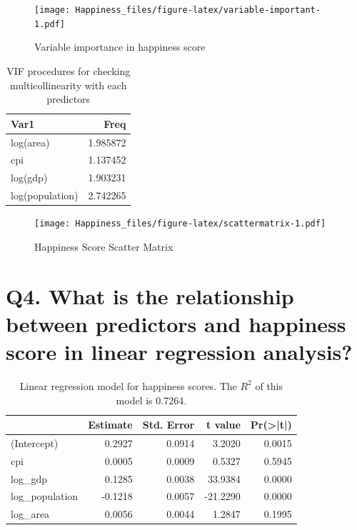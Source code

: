 \documentclass[11pt,a4paper,]{article}
\begin{document}
\begin{figure}
\centering
\texttt{[image: Happiness\_files/figure-latex/variable-important-1.pdf]}
\caption{\label{fig:variable-important}Variable importance in happiness score}
\end{figure}

\begin{table}

\caption{\label{tab:mulitilinearity}VIF procedures for checking multicollinearity with each predictors}
\begin{tabular}[t]{l|r}
\hline
Var1 & Freq\\
\hline
log(area) & 1.985872\\
\hline
cpi & 1.137452\\
\hline
log(gdp) & 1.903231\\
\hline
log(population) & 2.742265\\
\hline
\end{tabular}
\end{table}

\clearpage

\begin{figure}
\centering
\texttt{[image: Happiness\_files/figure-latex/scattermatrix-1.pdf]}
\caption{\label{fig:scattermatrix}Happiness Score Scatter Matrix}
\end{figure}

\clearpage

\hypertarget{q4.-what-is-the-relationship-between-predictors-and-happiness-score-in-linear-regression-analysis}{%
\section{Q4. What is the relationship between predictors and happiness score in linear regression analysis?}\label{q4.-what-is-the-relationship-between-predictors-and-happiness-score-in-linear-regression-analysis}}

\begin{table}

\caption{\label{tab:lmcoeff}Linear regression model for happiness scores. The $R^2$ of this model is 0.7264.}
\centering
\begin{tabular}[t]{lrrrr}
\toprule
  & Estimate & Std. Error & t value & Pr(>|t|)\\
\midrule
\rowcolor{gray!6}  (Intercept) & 0.2927 & 0.0914 & 3.2020 & 0.0015\\
cpi & 0.0005 & 0.0009 & 0.5327 & 0.5945\\
\rowcolor{gray!6}  log\_gdp & 0.1285 & 0.0038 & 33.9384 & 0.0000\\
log\_population & -0.1218 & 0.0057 & -21.2290 & 0.0000\\
\rowcolor{gray!6}  log\_area & 0.0056 & 0.0044 & 1.2847 & 0.1995\\
\bottomrule
\end{tabular}
\end{table}
\end{document}
